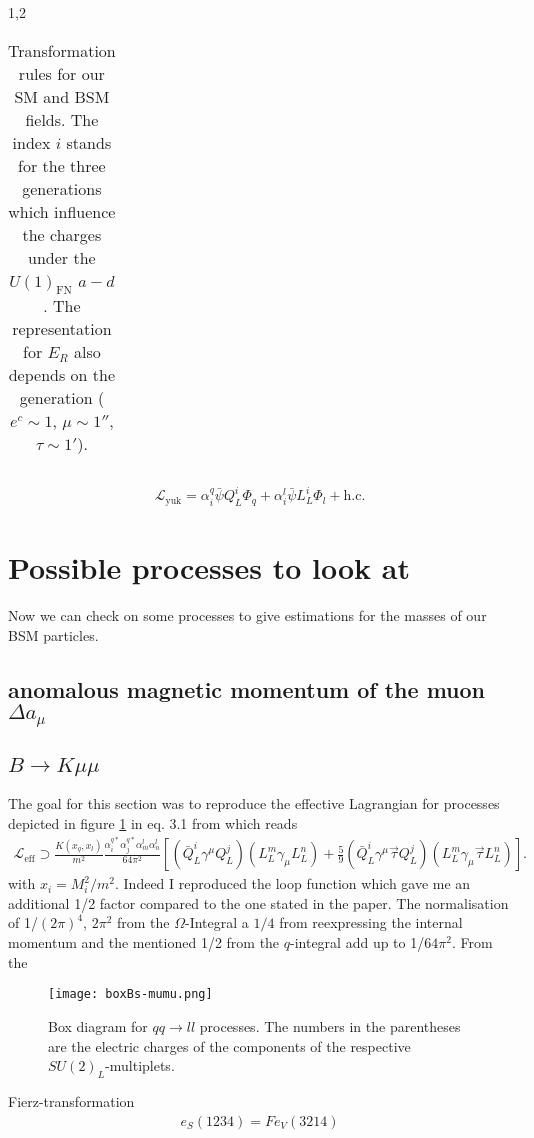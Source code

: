 \documentclass[11pt,a4paper,twoside]{article}
\begin{document}
\begin{spacing}{1,2}
\begin{table}
\begin{tabular}{c|c|c|c}
 \end{tabular}
\caption{Transformation rules for our SM and BSM fields. The index $i$ stands for the three generations which influence the charges under the 
$U(1)_\text{FN}$ $a-d$. The representation for $E_R$ also depends on the generation ($e^c \sim 1$, $\mu \sim 1''$, $\tau \sim 1'$).}
\label{tab_model}
\end{table}
\begin{align}
 \mathcal{L}_\text{yuk} = \alpha^q_i \bar \psi Q^i_L \Phi_q + \alpha^l_i\bar \psi L^i_L \Phi_l + \text{h.c.}
\end{align}


\section{Possible processes to look at}
Now we can check on some processes to give estimations for the masses of our BSM particles.
\subsection{anomalous magnetic momentum of the muon $\Delta a_\mu$}

\subsection{$B \rightarrow K\mu\mu$}
The goal for this section was to reproduce the effective Lagrangian for processes depicted in figure \ref{pic_boxqqll} in eq. 3.1 from \cite{Grip} which reads
\begin{align}
 \mathcal{L}_\text{eff} \supset \frac{K(x_q,x_l)}{m^2}\frac{\alpha_i^{q*} \alpha_j^{q*} \alpha_m^l \alpha_n^l}{64\pi^2}\left[\left(\bar Q^i_L\gamma^\mu Q^j_L\right)\left(L^m_L\gamma_\mu L^n_L\right)+\frac59\left(\bar Q^i_L\gamma^\mu \vec \tau Q^j_L\right)\left(L^m_L\gamma_\mu \vec \tau L^n_L\right)\right].
 \label{eq_effLag}
\end{align}
with $x_i = M_i^2/m^2$. Indeed I reproduced the loop function which gave me an additional 1/2 factor compared to the one stated in the paper. The normalisation of 1/$(2\pi)^4$, $2\pi^2$
from the $\Omega$-Integral a $1/4$ from reexpressing the internal momentum and the mentioned 1/2 from the $q$-integral add up to 1/$64\pi^2$. From the 
\begin{figure}[t]
 \texttt{[image: boxBs-mumu.png]}
 \caption{Box diagram for $qq\rightarrow ll$ processes. The numbers in the parentheses are the electric charges of the components of the respective $SU(2)_L$-multiplets.}
 \label{pic_boxqqll}
\end{figure}
Fierz-transformation \cite{Fierz}
\begin{align}
 e_S(1234) = F e_V(3214)
\end{align}


\end{spacing}
\end{document}
